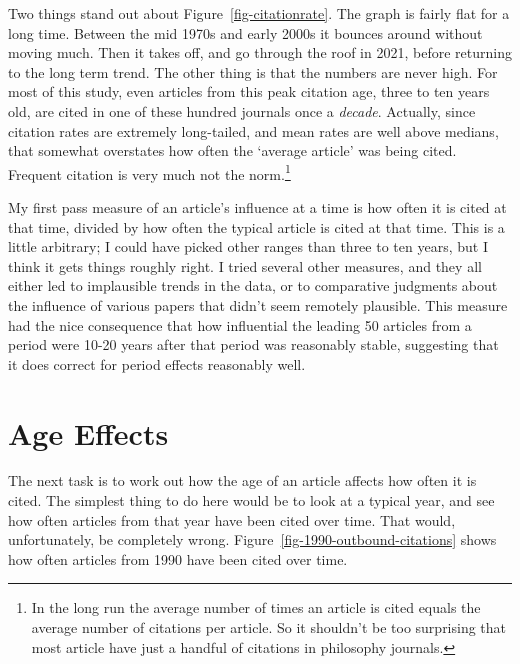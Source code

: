 \documentclass[
]{ergoclass}
\begin{document}
Two things stand out about Figure~\ref{fig-citationrate}. The graph is
fairly flat for a long time. Between the mid 1970s and early 2000s it
bounces around without moving much. Then it takes off, and go through
the roof in 2021, before returning to the long term trend. The other
thing is that the numbers are never high. For most of this study, even
articles from this peak citation age, three to ten years old, are cited
in one of these hundred journals once a \emph{decade}. Actually, since
citation rates are extremely long-tailed, and mean rates are well above
medians, that somewhat overstates how often the `average article' was
being cited. Frequent citation is very much not the norm.\footnote{In
  the long run the average number of times an article is cited equals
  the average number of citations per article. So it shouldn't be too
  surprising that most article have just a handful of citations in
  philosophy journals.}

My first pass measure of an article's influence at a time is how often
it is cited at that time, divided by how often the typical article is
cited at that time. This is a little arbitrary; I could have picked
other ranges than three to ten years, but I think it gets things roughly
right. I tried several other measures, and they all either led to
implausible trends in the data, or to comparative judgments about the
influence of various papers that didn't seem remotely plausible. This
measure had the nice consequence that how influential the leading 50
articles from a period were 10-20 years after that period was reasonably
stable, suggesting that it does correct for period effects reasonably
well.

\section{Age Effects}\label{sec-age}

The next task is to work out how the age of an article affects how often
it is cited. The simplest thing to do here would be to look at a typical
year, and see how often articles from that year have been cited over
time. That would, unfortunately, be completely wrong.
Figure~\ref{fig-1990-outbound-citations} shows how often articles from
1990 have been cited over time.
\end{document}
